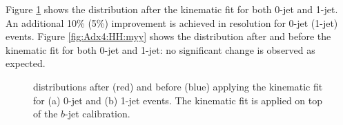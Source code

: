 Figure \ref{fig:Adx4:HH:mbb} shows the \mbb distribution after the kinematic fit for both 0-jet and 1-jet. An additional 10\% (5\%) improvement is achieved in \mbb resolution for 0-jet (1-jet) events. Figure \ref{fig:Adx4:HH:myy} shows the \myy distribution after and before the kinematic fit for both 0-jet and 1-jet: no significant change is observed as expected.
\begin{figure}[htbp]
   \centering
   \begin{tcolorbox}[colback=black!5!white,colframe=white!75!black]
   \caption{\mbb distributions after (red) and before (blue) applying the kinematic fit for (a) 0-jet and (b) 1-jet events. The kinematic fit is applied on top of the $b$-jet calibration.}
   \label{fig:Adx4:HH:mbb}
   \end{tcolorbox}
   
\end{figure}

